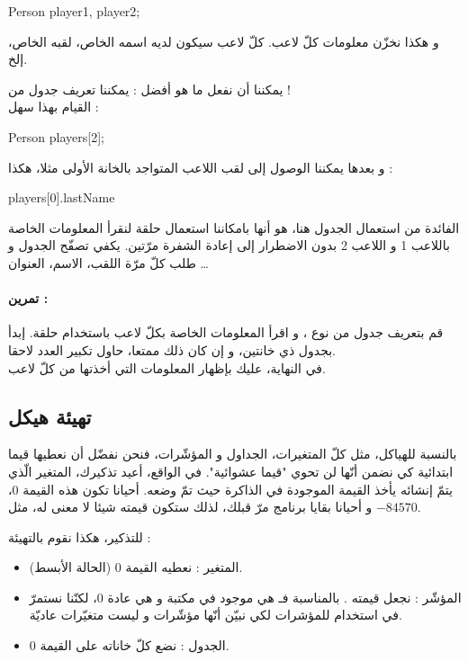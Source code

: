 \begin{Csource}
Person player1, player2;
\end{Csource}

و هكذا نخزّن معلومات كلّ لاعب. كلّ لاعب سيكون لديه اسمه الخاص، لقبه الخاص، إلخ.

يمكننا أن نفعل ما هو أفضل : يمكننا تعريف جدول من
 !\\
القيام بهذا سهل :

\begin{Csource}
Person players[2];
\end{Csource}

و بعدها يمكننا الوصول إلى لقب اللاعب المتواجد بالخانة الأولى مثلا، هكذا :

\begin{Console}
players[0].lastName
\end{Console}

الفائدة من استعمال الجدول هنا، هو أنها بامكاننا استعمال حلقة لنقرأ المعلومات الخاصة باللاعب 1 و اللاعب 2 بدون الاضطرار إلى إعادة الشفرة مرّتين. يكفي تصفّح الجدول
و طلب كلّ مرّة اللقب، الاسم، العنوان \dots

\paragraph{تمرين :}
قم بتعريف جدول من نوع
،
و اقرأ المعلومات الخاصة بكلّ لاعب باستخدام حلقة. إبدأ بجدول ذي خانتين، و إن كان ذلك ممتعا، حاول تكبير العدد لاحقا.\\
في النهاية، عليك بإظهار المعلومات التي أخذتها من كلّ لاعب.

\subsection{تهيئة هيكل}

بالنسبة للهياكل، مثل كلّ المتغيرات، الجداول و المؤشّرات، فنحن نفضّل أن نعطيها قيما ابتدائية كي نضمن أنّها لن تحوي "قيما عشوائية". في الواقع، أعيد تذكيرك، المتغير الّذي يتمّ إنشائه يأخذ القيمة الموجودة في الذاكرة حيث تمّ وضعه. أحيانا تكون هذه القيمة $ 0 $، و أحيانا بقايا برنامج مرّ قبلك، لذلك ستكون قيمته شيئا لا معنى له، مثل
$-84570$.

للتذكير، هكذا نقوم بالتهيئة :

\begin{itemize}
  \item  المتغير : نعطيه القيمة 0 (الحالة الأبسط).
  \item المؤشّر : نجعل قيمته
.
بالمناسبة فـ
هي
موجود في مكتبة
و هي عادة 0، لكنّنا نستمرّ في استخدام
للمؤشرات لكي نبيّن أنّها مؤشّرات و ليست متغيّرات عاديّة.
  \item الجدول : نضع كلّ خاناته على القيمة 0.
\end{itemize}

